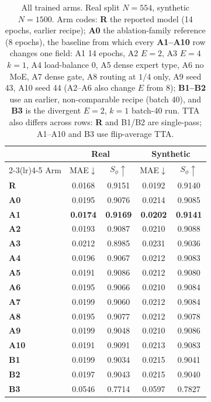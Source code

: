 \documentclass[10pt,a4paper,twocolumn,twoside]{article}
\begin{document}
\begin{table}[tbp]
\centering
\caption{All trained arms. Real split $N{=}554$, synthetic $N{=}1500$.
Arm codes: \textbf{R} the reported model (14 epochs, earlier recipe); \textbf{A0} the
ablation-family reference (8 epochs), the baseline from which every \textbf{A1--A10} row
changes one field:
A1 14 epochs, A2 $E{=}2$, A3 $E{=}4$ $k{=}1$, A4 load-balance $0$, A5 dense expert type,
A6 no MoE, A7 dense gate, A8 routing at $1/4$ only, A9 seed 43, A10 seed 44
(A2--A6 also change $E$ from 8);
\textbf{B1--B2} use an earlier, non-comparable recipe (batch 40), and \textbf{B3} is the
divergent $E{=}2$, $k{=}1$ batch-40 run. TTA also differs across rows: \textbf{R} and B1/B2 are
single-pass; A1--A10 and B3 use flip-average TTA.}
\label{tab:ablate}
\footnotesize
\begin{tabular}{@{}lcccc@{}}
\toprule
& \multicolumn{2}{c}{Real} & \multicolumn{2}{c}{Synthetic} \\
\cmidrule(lr){2-3}\cmidrule(lr){4-5}
Arm & MAE$\downarrow$ & $S_\phi\uparrow$ & MAE$\downarrow$ & $S_\phi\uparrow$ \\
\midrule
\textbf{R}   & 0.0168 & 0.9151 & 0.0192 & 0.9140 \\
\midrule
\textbf{A0} & 0.0195 & 0.9076 & 0.0214 & 0.9085 \\
\textbf{A1}  & \textbf{0.0174} & \textbf{0.9169} & \textbf{0.0202} & \textbf{0.9141} \\
\textbf{A2}  & 0.0193 & 0.9087 & 0.0210 & 0.9088 \\
\textbf{A3}  & 0.0212 & 0.8985 & 0.0231 & 0.9036 \\
\textbf{A4}  & 0.0196 & 0.9067 & 0.0212 & 0.9083 \\
\textbf{A5}  & 0.0191 & 0.9086 & 0.0212 & 0.9080 \\
\textbf{A6}  & 0.0195 & 0.9066 & 0.0210 & 0.9084 \\
\textbf{A7}  & 0.0199 & 0.9060 & 0.0212 & 0.9084 \\
\textbf{A8}  & 0.0195 & 0.9077 & 0.0212 & 0.9078 \\
\textbf{A9}  & 0.0199 & 0.9048 & 0.0210 & 0.9086 \\
\textbf{A10} & 0.0191 & 0.9091 & 0.0213 & 0.9083 \\
\midrule
\textbf{B1} & 0.0199 & 0.9034 & 0.0215 & 0.9041 \\
\textbf{B2} & 0.0197 & 0.9043 & 0.0215 & 0.9040 \\
\textbf{B3} & 0.0546 & 0.7714 & 0.0597 & 0.7827 \\
\bottomrule
\end{tabular}
\end{table}
\end{document}
